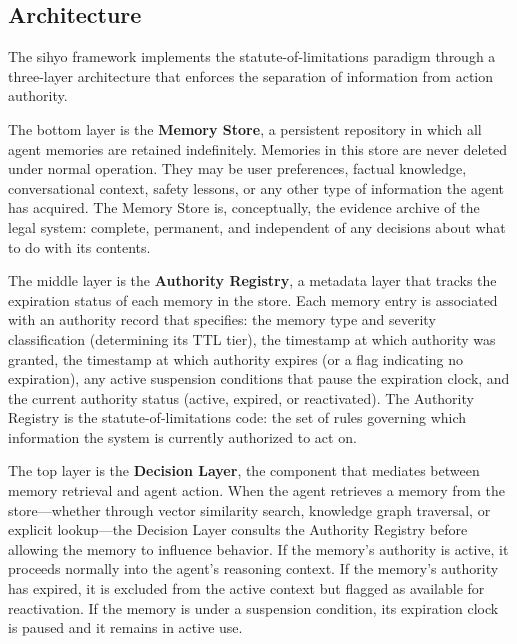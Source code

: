 \documentclass[12pt]{article}
\begin{document}
\subsection{Architecture}
\label{sec:architecture}

The sihyo framework implements the statute-of-limitations paradigm through a three-layer architecture that enforces the separation of information from action authority.

The bottom layer is the \textbf{Memory Store}, a persistent repository in which all agent memories are retained indefinitely. Memories in this store are never deleted under normal operation. They may be user preferences, factual knowledge, conversational context, safety lessons, or any other type of information the agent has acquired. The Memory Store is, conceptually, the evidence archive of the legal system: complete, permanent, and independent of any decisions about what to do with its contents.

The middle layer is the \textbf{Authority Registry}, a metadata layer that tracks the expiration status of each memory in the store. Each memory entry is associated with an authority record that specifies: the memory type and severity classification (determining its TTL tier), the timestamp at which authority was granted, the timestamp at which authority expires (or a flag indicating no expiration), any active suspension conditions that pause the expiration clock, and the current authority status (active, expired, or reactivated). The Authority Registry is the statute-of-limitations code: the set of rules governing which information the system is currently authorized to act on.

The top layer is the \textbf{Decision Layer}, the component that mediates between memory retrieval and agent action. When the agent retrieves a memory from the store---whether through vector similarity search, knowledge graph traversal, or explicit lookup---the Decision Layer consults the Authority Registry before allowing the memory to influence behavior. If the memory's authority is active, it proceeds normally into the agent's reasoning context. If the memory's authority has expired, it is excluded from the active context but flagged as available for reactivation. If the memory is under a suspension condition, its expiration clock is paused and it remains in active use.
\end{document}
